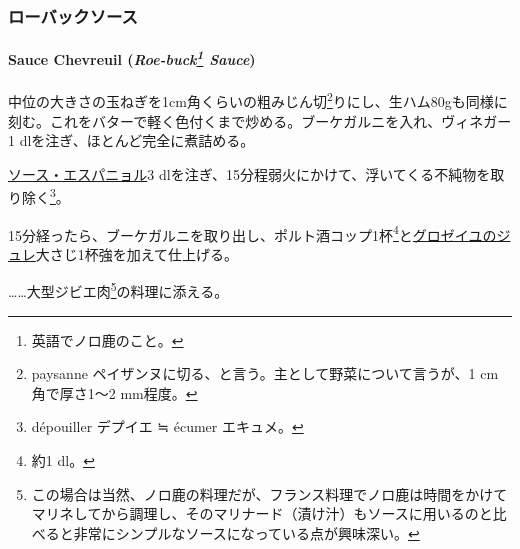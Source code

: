 \begin{recette}
\maeaki

\hypertarget{ux30edux30fcux30d0ux30c3ux30afux30bdux30fcux30b9}{%
\subsubsection{ローバックソース}\label{ux30edux30fcux30d0ux30c3ux30afux30bdux30fcux30b9}}

\hypertarget{roe-buck-sauce}{%
\paragraph[Sauce Chevreuil ()]{\texorpdfstring{Sauce Chevreuil
(\emph{Roe-buck\footnote{英語でノロ鹿のこと。}
Sauce})}{Sauce Chevreuil (Roe-buck Sauce)}}\label{roe-buck-sauce}}


中位の大きさの玉ねぎを1cm角くらいの粗みじん切\footnote{paysanne
  ペイザンヌに切る、と言う。主として野菜について言うが、1 cm角で厚さ1〜2
  mm程度。}りにし、生ハム80gも同様に刻む。これをバターで軽く色付くまで炒める。ブーケガルニを入れ、ヴィネガー1\undemi{}
dlを注ぎ、ほとんど完全に煮詰める。

\protect\hyperlink{sauce-espagnole}{ソース・エスパニョル}3
dlを注ぎ、15分程弱火にかけて、浮いてくる不純物を取り除く\footnote{dépouiller
  デプイエ ≒ écumer エキュメ。}。

15分経ったら、ブーケガルニを取り出し、ポルト酒コップ1杯\footnote{約1
  dl。}と\protect\hyperlink{}{グロゼイユのジュレ}大さじ1杯強を加えて仕上げる。

\ldots{}\ldots{}大型ジビエ肉\footnote{この場合は当然、ノロ鹿の料理だが、フランス料理でノロ鹿は時間をかけてマリネしてから調理し、そのマリナード（漬け汁）もソースに用いるのと比べると非常にシンプルなソースになっている点が興味深い。}の料理に添える。

\maeaki

\hypertarget{ux30afux30eaux30fcux30e0ux30bdux30fcux30b9}{%
}
\end{recette}
